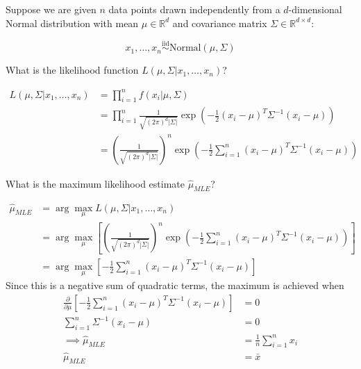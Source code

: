 \documentclass{article}
\newcommand{\R}{\mathbb{R}}
\newcommand{\iid}{\stackrel{\text{iid}}{\sim}}
\begin{document}
\begin{probset}
\newpage

\begin{prob}
Suppose we are given $n$ data points drawn independently from a $d$-dimensional Normal distribution with mean $\mu \in \R^d$ and covariance matrix $\Sigma \in \R^{d \times d}$:

\[ x_1, \dots, x_n \iid \text{Normal}(\mu, \Sigma) \]

\begin{subprobset}
    \begin{subprob}
        What is the likelihood function $L(\mu, \Sigma | x_1, \dots, x_n)$?

        \begin{soln}
            \begin{align*}
                L(\mu, \Sigma | x_1, \dots, x_n) &= \prod_{i=1}^n f(x_i | \mu, \Sigma) \\
                &= \prod_{i=1}^n \frac{1}{\sqrt{(2\pi)^d |\Sigma|}} \exp\left(-\frac{1}{2} (x_i - \mu)^T \Sigma^{-1} (x_i - \mu)\right) \\
                &= \left(\frac{1}{\sqrt{(2\pi)^d |\Sigma|}}\right)^n \exp\left(-\frac{1}{2} \sum_{i=1}^n (x_i - \mu)^T \Sigma^{-1} (x_i - \mu)\right)
            \end{align*}
        \end{soln}
    \end{subprob}

    \begin{subprob}
        What is the maximum likelihood estimate $\hat{\mu}_{MLE}$?

        \begin{soln}
            \begin{align*}
                \hat{\mu}_{MLE} &= \arg\max_{\mu} L(\mu, \Sigma | x_1, \dots, x_n) \\
                &= \arg\max_{\mu} \left[ \left(\frac{1}{\sqrt{(2\pi)^d |\Sigma|}}\right)^n \exp\left(-\frac{1}{2} \sum_{i=1}^n (x_i - \mu)^T \Sigma^{-1} (x_i - \mu)\right) \right] \\
                &= \arg\max_{\mu} \left[ -\frac{1}{2} \sum_{i=1}^n (x_i - \mu)^T \Sigma^{-1} (x_i - \mu) \right]
            \end{align*}
            Since this is a negative sum of quadratic terms, the maximum is achieved when 
            \begin{align*}
                \frac{\partial}{\partial \mu} \left[ -\frac{1}{2} \sum_{i=1}^n (x_i - \mu)^T \Sigma^{-1} (x_i - \mu) \right] &= 0 \\
                \sum_{i=1}^n \Sigma^{-1} (x_i - \mu) &= 0 \\
                \implies \hat{\mu}_{MLE} &= \frac{1}{n} \sum_{i=1}^n x_i \\
                \hat{\mu}_{MLE} &= \bar{x}
            \end{align*}
        \end{soln}
    \end{subprob}


\end{subprobset}
\end{prob}
\end{probset}
\end{document}
